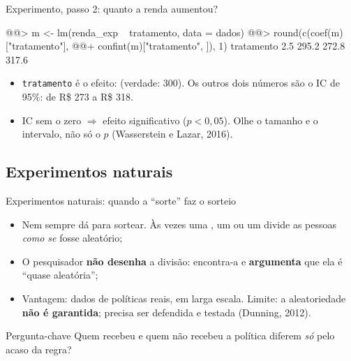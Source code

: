 \begin{frame}[fragile]{Experimento, passo 2: quanto a renda aumentou?}
\begin{consoleR}
@@> m <- lm(renda_exp ~ tratamento, data = dados)
@@> round(c(coef(m)["tratamento"],
@@+         confint(m)["tratamento", ]), 1)
tratamento      2.5 %
     295.2      272.8      317.6
\end{consoleR}
\begin{leitura}
  \begin{itemize}\setlength{\itemsep}{1pt}
    \item {} \texttt{tratamento} é o efeito:  (verdade: 300). Os outros dois números são o IC de 95\%: de R\$ 273 a R\$ 318.
    \item {} IC sem o zero $\Rightarrow$ efeito significativo ($p<0{,}05$). Olhe o tamanho e o intervalo, não só o $p$ (Wasserstein e Lazar, 2016).
  \end{itemize}
\end{leitura}
\end{frame}

\subsection{Experimentos naturais}

\begin{frame}{Experimentos naturais: quando a ``sorte'' faz o sorteio}
  \begin{itemize}
    \item Nem sempre dá para sortear. Às vezes uma , um  ou um  divide as pessoas \emph{como se} fosse aleatório;
    \item O pesquisador \textbf{não desenha} a divisão: encontra-a e \textbf{argumenta} que ela é ``quase aleatória'';
    \item Vantagem: dados de políticas reais, em larga escala. Limite: a aleatoriedade \textbf{não é garantida}; precisa ser defendida e testada (Dunning, 2012).
  \end{itemize}
  \vspace{0.2cm}
  \begin{block}{Pergunta-chave}
    \small Quem recebeu e quem não recebeu a política diferem \emph{só} pelo acaso da regra?
  \end{block}
\end{frame}

